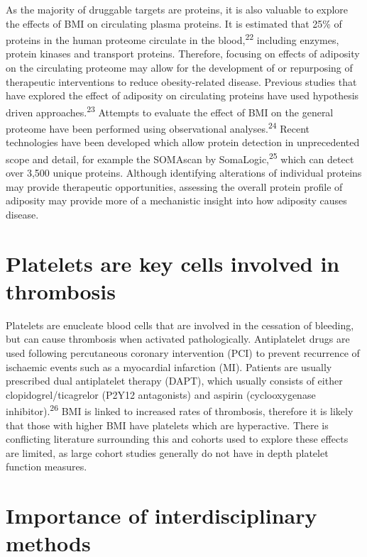 \documentclass[11pt,twoside]{bristolthesis}
\begin{document}
As the majority of druggable targets are proteins, it is also valuable to explore the effects of BMI on circulating plasma proteins. It is estimated that 25\% of proteins in the human proteome circulate in the blood,\textsuperscript{22} including enzymes, protein kinases and transport proteins. Therefore, focusing on effects of adiposity on the circulating proteome may allow for the development of or repurposing of therapeutic interventions to reduce obesity-related disease. Previous studies that have explored the effect of adiposity on circulating proteins have used hypothesis driven approaches.\textsuperscript{23} Attempts to evaluate the effect of BMI on the general proteome have been performed using observational analyses.\textsuperscript{24} Recent technologies have been developed which allow protein detection in unprecedented scope and detail, for example the SOMAscan by SomaLogic,\textsuperscript{25} which can detect over 3,500 unique proteins. Although identifying alterations of individual proteins may provide therapeutic opportunities, assessing the overall protein profile of adiposity may provide more of a mechanistic insight into how adiposity causes disease.

\hypertarget{platelets-are-key-cells-involved-in-thrombosis}{%
\section{Platelets are key cells involved in thrombosis}\label{platelets-are-key-cells-involved-in-thrombosis}}

Platelets are enucleate blood cells that are involved in the cessation of bleeding, but can cause thrombosis when activated pathologically. Antiplatelet drugs are used following percutaneous coronary intervention (PCI) to prevent recurrence of ischaemic events such as a myocardial infarction (MI). Patients are usually prescribed dual antiplatelet therapy (DAPT), which usually consists of either clopidogrel/ticagrelor (P2Y12 antagonists) and aspirin (cyclooxygenase inhibitor).\textsuperscript{26}
BMI is linked to increased rates of thrombosis, therefore it is likely that those with higher BMI have platelets which are hyperactive. There is conflicting literature surrounding this and cohorts used to explore these effects are limited, as large cohort studies generally do not have in depth platelet function measures.

\hypertarget{importance-of-interdisciplinary-methods}{%
\section{Importance of interdisciplinary methods}\label{importance-of-interdisciplinary-methods}}
\end{document}
